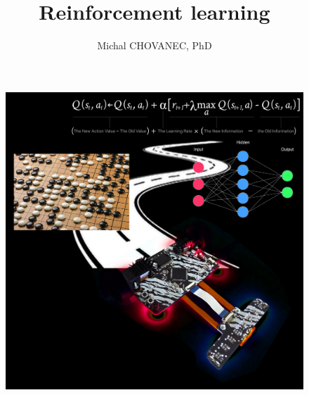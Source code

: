 \documentclass[xcolor=dvipsnames]{beamer}
\title{\bf Reinforcement learning}
\author{Michal CHOVANEC, PhD}
\date[EURP]{}
\begin{document}
\begin{frame}
\titlepage

\vspace{-50pt}
  \begin{figure}[htc]
    \includegraphics[scale=0.04]{../../pictures/rl_square.jpg}
  \end{figure}


\end{frame}
\end{document}

